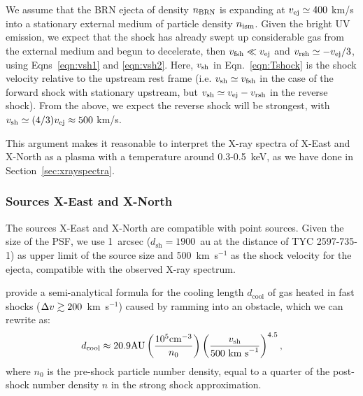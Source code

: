 \documentclass[linenumbers]{aastex631}
\begin{document}

We assume that the BRN ejecta of density $n_{\rm BRN}$ is expanding at $v_{\rm ej} \simeq 400$ km/s into a stationary external medium of particle density $n_{\rm ism}$. Given the bright UV emission, we expect that the shock has already swept up considerable gas from the external medium and begun to decelerate, then $v_{\rm fsh} \ll v_{\rm ej}$ and $v_{\rm rsh} \simeq -v_{\rm ej}/3$, using Eqns~\ref{eqn:vsh1} and \ref{eqn:vsh2}.  Here, $v_{\rm sh}$ in Eqn.~\ref{eqn:Tshock} is the shock velocity relative to the upstream rest frame (i.e. $v_{\rm sh} \simeq v_{\rm fsh}$ in the case of the forward shock with stationary upstream, but $v_{\rm sh} \simeq v_{\rm ej}-v_{\rm rsh}$ in the reverse shock).  From the above, we expect the reverse shock will be strongest, with $v_{\rm sh} \simeq (4/3)v_{\rm ej} \approx 500$ km/s.

This argument makes it reasonable to interpret the X-ray spectra of X-East and X-North as a plasma with a temperature around 0.3-0.5~keV, as we have done in Section~\ref{sec:xrayspectra}.

\subsubsection{Sources X-East and X-North}
\label{sec:xEN}
The sources X-East and X-North are compatible with point sources. Given the size of the PSF, we use 1~arcsec ($d_\mathrm{sh}=1900$~au at the distance of TYC 2597-735-1) as upper limit of the source size and 500~km~s$^{-1}$ as the shock velocity for the ejecta, compatible with the observed X-ray spectrum.

\citet{2002ApJ...576L.149R} provide a
semi-analytical formula for the cooling length
$d_{\mathrm{cool}}$ of gas
heated in fast shocks ($\Delta v \gtrsim 200$~km~s$^{-1}$) caused by ramming into an obstacle,
which we can rewrite as:
\begin{equation}
d_{\mathrm{cool}} \approx 20.9 \mathrm{ AU}
    \left(\frac{10^5\mathrm{ cm}^{-3}}{n_0}\right)
    \left(\frac{v_{\mathrm{sh}}}{500\textnormal{ km s}^{-1}}\right)^{4.5},
\label{raga}
\end{equation}
where $n_0$ is the pre-shock particle number density, equal to a
quarter of the post-shock number density $n$ in the strong shock
approximation.
\end{document}
